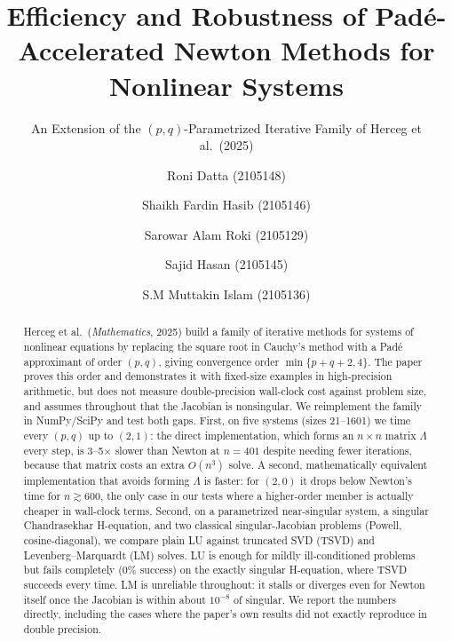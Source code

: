 \documentclass[sigconf,nonacm]{acmart}
\begin{document}
\title{Efficiency and Robustness of Pad\'e-Accelerated Newton Methods for Nonlinear Systems}
\subtitle{An Extension of the $(p,q)$-Parametrized Iterative Family of Herceg et al.\ (2025)}

\author{Roni Datta (2105148)}
\author{Shaikh Fardin Hasib (2105146)}
\author{Sarowar Alam Roki (2105129)}
\author{Sajid Hasan (2105145)}
\author{S.M Muttakin Islam (2105136)}

\renewcommand{\shortauthors}{Datta et al.}

\newcommand{\groupno}{10}

\begin{abstract}
Herceg et al.\ (\textit{Mathematics}, 2025) build a family of iterative methods for systems of
nonlinear equations by replacing the square root in Cauchy's method with a Pad\'e
approximant of order $(p,q)$, giving convergence order $\min\{p+q+2,4\}$. The paper proves
this order and demonstrates it with fixed-size examples in high-precision arithmetic, but does
not measure double-precision wall-clock cost against problem size, and assumes throughout
that the Jacobian is nonsingular. We reimplement the family in NumPy/SciPy and test both
gaps. First, on five systems (sizes 21--1601) we time every $(p,q)$ up to $(2,1)$: the direct
implementation, which forms an $n\times n$ matrix $\Lambda$ every step, is 3--5$\times$ slower
than Newton at $n=401$ despite needing fewer iterations, because that matrix costs an extra
$O(n^3)$ solve. A second, mathematically equivalent implementation that avoids forming
$\Lambda$ is faster: for $(2,0)$ it drops below Newton's time for $n\gtrsim 600$, the only case
in our tests where a higher-order member is actually cheaper in wall-clock terms. Second, on a
parametrized near-singular system, a singular Chandrasekhar H-equation, and two classical
singular-Jacobian problems (Powell, cosine-diagonal), we compare plain LU against truncated
SVD (TSVD) and Levenberg--Marquardt (LM) solves. LU is enough for mildly ill-conditioned
problems but fails completely (0\% success) on the exactly singular H-equation, where TSVD
succeeds every time. LM is unreliable throughout: it stalls or diverges even for Newton itself
once the Jacobian is within about $10^{-8}$ of singular. We report the numbers directly,
including the cases where the paper's own results did not exactly reproduce in double
precision.
\end{abstract}
\end{document}
